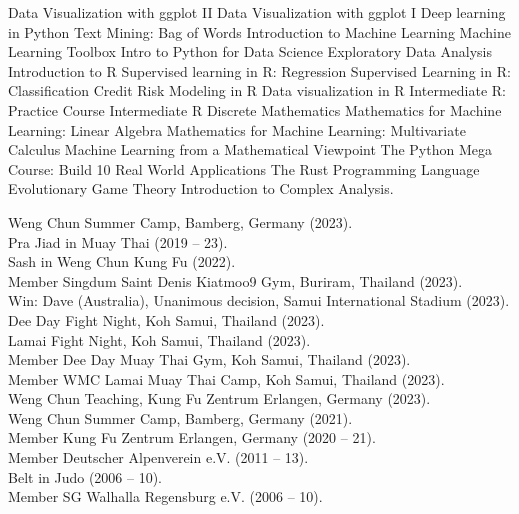 \documentclass[a4paper,11pt]{article}
\newcommand{\years}[1]{\marginnote{\scriptsize #1}}
\begin{document}
\years{Certificates} Data Visualization with ggplot II \bullet{} Data Visualization with ggplot I \bullet{} Deep learning in Python \bullet{} Text Mining: Bag of Words \bullet{} Introduction to Machine Learning \bullet{} Machine Learning Toolbox \bullet{} Intro to Python for Data Science \bullet{} Exploratory Data Analysis \bullet{} Introduction to R \bullet{} Supervised learning in R: Regression \bullet{} Supervised Learning in R: Classification \bullet{} Credit Risk Modeling in R \bullet{} Data visualization in R \bullet{} Intermediate R: Practice Course \bullet{} Intermediate R \bullet{} Discrete Mathematics \bullet{} Mathematics for Machine Learning: Linear Algebra \bullet{} Mathematics for Machine Learning: Multivariate Calculus \bullet{} Machine Learning from a Mathematical Viewpoint \bullet The Python Mega Course: Build 10 Real World Applications \bullet{} The Rust Programming Language \bullet{} Evolutionary Game Theory \bullet{}
Introduction to Complex Analysis.\\
\vspace{2pt}

\years{Sports}
Weng Chun Summer Camp, Bamberg, Germany (2023).\\
{\Large\color{amber}\circ} {\Large\color{bittersweet}\circ} {\Large\color{darkcyan}\circ} {\Large\color{denim}\circ} {\Large\color{darkmagenta}\circ} {\Large\color{red}\circ} {\Large\color{brown}\circ}  {\Large\color{black}\circ} Pra Jiad in Muay Thai (2019 -- 23).\\
{\Large\color{amber}\circ} {\Large\color{bittersweet}\circ} {\Large\color{darkcyan}\circ} Sash in Weng Chun Kung Fu (2022).\\
Member Singdum Saint Denis Kiatmoo9 Gym, Buriram, Thailand (2023).\\
Win: Dave (Australia), Unanimous decision, Samui International Stadium (2023).\\
Dee Day Fight Night, Koh Samui, Thailand (2023).\\
Lamai Fight Night, Koh Samui, Thailand (2023).\\
Member Dee Day Muay Thai Gym, Koh Samui, Thailand (2023).\\
Member WMC Lamai Muay Thai Camp, Koh Samui, Thailand (2023).\\
Weng Chun Teaching, Kung Fu Zentrum Erlangen, Germany (2023).\\
Weng Chun Summer Camp, Bamberg, Germany (2021).\\
Member Kung Fu Zentrum Erlangen, Germany (2020 -- 21).\\
Member Deutscher Alpenverein e.V. (2011 -- 13).\\
{\Large\color{amber}\circ} {\Large\color{bittersweet}\circ} {\Large\color{darkcyan}\circ} {\Large\color{denim}\circ} Belt in Judo (2006 -- 10).\\
Member SG Walhalla Regensburg e.V. (2006 -- 10).
\end{document}
